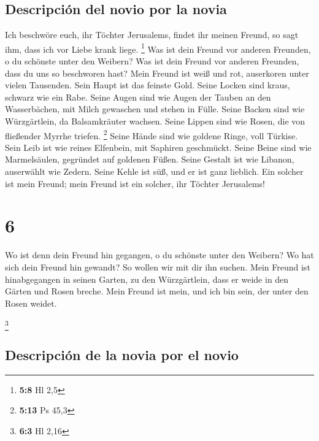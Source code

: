 \hypertarget{descripciuxf3n-del-novio-por-la-novia}{%
\subsection{Descripción del novio por la
novia}\label{descripciuxf3n-del-novio-por-la-novia}}

 Ich beschwöre euch, ihr Töchter Jerusalems, findet ihr
meinen Freund, so sagt ihm, dass ich vor Liebe krank liege. \footnote{\textbf{5:8}
  Hl 2,5}  Was ist dein Freund vor anderen Freunden, o du
schönste unter den Weibern? Was ist dein Freund vor anderen Freunden,
dass du uns so beschworen hast?  Mein Freund ist weiß und
rot, auserkoren unter vielen Tausenden.  Sein Haupt ist
das feinste Gold. Seine Locken sind kraus, schwarz wie ein Rabe.
 Seine Augen sind wie Augen der Tauben an den
Wasserbächen, mit Milch gewaschen und stehen in Fülle. 
Seine Backen sind wie Würzgärtlein, da Balsamkräuter wachsen. Seine
Lippen sind wie Rosen, die von fließender Myrrhe triefen. \footnote{\textbf{5:13}
  Ps 45,3}  Seine Hände sind wie goldene Ringe, voll
Türkise. Sein Leib ist wie reines Elfenbein, mit Saphiren geschmückt.
 Seine Beine sind wie Marmelsäulen, gegründet auf
goldenen Füßen. Seine Gestalt ist wie Libanon, auserwählt wie Zedern.
 Seine Kehle ist süß, und er ist ganz lieblich. Ein
solcher ist mein Freund; mein Freund ist ein solcher, ihr Töchter
Jerusalems!

\hypertarget{section-5}{%
\section{6}\label{section-5}}

 Wo ist denn dein Freund hin gegangen, o du schönste unter
den Weibern? Wo hat sich dein Freund hin gewandt? So wollen wir mit dir
ihn suchen.  Mein Freund ist hinabgegangen in seinen
Garten, zu den Würzgärtlein, dass er weide in den Gärten und Rosen
breche.  Mein Freund ist mein, und ich bin sein, der unter
den Rosen weidet.

\footnote{\textbf{6:3} Hl 2,16}

\hypertarget{descripciuxf3n-de-la-novia-por-el-novio-1}{%
\subsection{Descripción de la novia por el
novio}\label{descripciuxf3n-de-la-novia-por-el-novio-1}}

